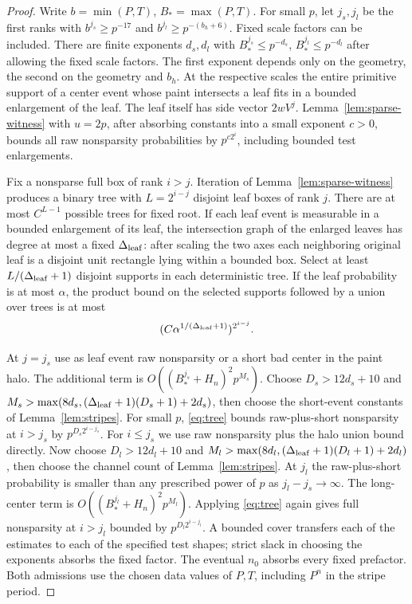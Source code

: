 \begin{proof}
Write \(b=\min(P,T)\), \(B_*=\max(P,T)\). For small \(p\), let \(j_s,j_l\) be the first ranks with \(b^{j_s}\ge p^{-17}\) and \(b^{j_l}\ge p^{-(b_h+6)}\). Fixed scale factors can be included. There are finite exponents \(d_s,d_l\) with \(B_*^{j_s}\le p^{-d_s}\), \(B_*^{j_l}\le p^{-d_l}\) after allowing the fixed scale factors. The first exponent depends only on the geometry, the second on the geometry and \(b_h\). At the respective scales the entire primitive support of a center event whose paint intersects a leaf fits in a bounded enlargement of the leaf. The leaf itself has side vector \(2wV^j\). Lemma~\ref{lem:sparse-witness} with \(u=2p\), after absorbing constants into a small exponent \(c>0\), bounds all raw nonsparsity probabilities by \(p^{c2^i}\), including bounded test enlargements.

Fix a nonsparse full box of rank \(i>j\). Iteration of Lemma~\ref{lem:sparse-witness} produces a binary tree with \(L=2^{i-j}\) disjoint leaf boxes of rank \(j\). There are at most \(C^{L-1}\) possible trees for fixed root. If each leaf event is measurable in a bounded enlargement of its leaf, the intersection graph of the enlarged leaves has degree at most a fixed \(\Delta_{\rm leaf}\): after scaling the two axes each neighboring original leaf is a disjoint unit rectangle lying within a bounded box. Select at least \(L/(\Delta_{\rm leaf}+1)\) disjoint supports in each deterministic tree. If the leaf probability is at most \(\alpha\), the product bound on the selected supports followed by a union over trees is at most
\begin{equation}\label{eq:tree}
(C\alpha^{1/(\Delta_{\rm leaf}+1)})^{2^{i-j}}.
\end{equation}

At \(j=j_s\) use as leaf event raw nonsparsity or a short bad center in the paint halo. The additional term is \(O((B_*^{j_s}+H_n)^2p^{M_s})\). Choose \(D_s>12d_s+10\) and \(M_s>\max(8d_s,(\Delta_{\rm leaf}+1)(D_s+1)+2d_s)\), then choose the short-event constants of Lemma~\ref{lem:stripes}. For small \(p\), \eqref{eq:tree} bounds raw-plus-short nonsparsity at \(i>j_s\) by \(p^{D_s 2^{i-j_s}}\). For \(i\le j_s\) we use raw nonsparsity plus the halo union bound directly. Now choose \(D_l>12d_l+10\) and \(M_l>\max(8d_l,(\Delta_{\rm leaf}+1)(D_l+1)+2d_l)\), then choose the channel count of Lemma~\ref{lem:stripes}. At \(j_l\) the raw-plus-short probability is smaller than any prescribed power of \(p\) as \(j_l-j_s\to\infty\). The long-center term is \(O((B_*^{j_l}+H_n)^2p^{M_l})\). Applying \eqref{eq:tree} again gives full nonsparsity at \(i>j_l\) bounded by \(p^{D_l2^{i-j_l}}\). A bounded cover transfers each of the estimates to each of the specified test shapes; strict slack in choosing the exponents absorbs the fixed factor. The eventual \(n_0\) absorbs every fixed prefactor. Both admissions use the chosen data values of \(P,T\), including \(P^n\) in the stripe period.


\end{proof}
